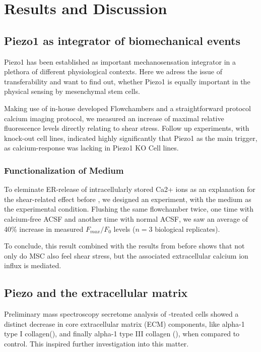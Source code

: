 \chapter{Results and Discussion}


\section{Piezo1 as integrator of biomechanical events}

Piezo1 has been established as important mechanosensation integrator\cite{Murthy2017PiezosTU}  in a plethora of different physiological contexts. Here we adress the issue of transferability and want to find out, whether Piezo1 is equally important in the physical sensing by mesenchymal stem cells.

Making use of in-house developed Flowchambers and a straightforward protocol calcium imaging protocol, we measured an increase of maximal relative fluorescence levels directly relating to shear stress. Follow up experiments, with knock-out cell lines, indicated highly significantly that Piezo1 as the main trigger, as calcium-response was lacking in  Piezo1 KO Cell lines.


\subsection{Functionalization of Medium}
To eleminate ER-release of intracellularly stored Ca2+ ions as an explanation for the shear-related effect before , we designed an experiment, with the medium as the experimental condition. Flushing the same flowchamber twice, one time with calcium-free ACSF and another time with normal ACSF, we saw an average of 40\% increase in measured $F_{max}/F_{0}$ levels ($n=3$ biological replicates).\par
To conclude, this result combined with the results from before shows that not only do MSC also feel shear stress, but the associated extracellular calcium ion influx is \Piezo mediated. 


\section{Piezo and the extracellular matrix}

Preliminary mass spectroscopy secretome analysis of \Yoda-treated cells showed a distinct decrease in core extracellular matrix (ECM) components, like alpha-1 type I collagen(\colone),  and finally alpha-1 type III collagen (\colthree), when compared to control.
This inspired further investigation into this matter.

